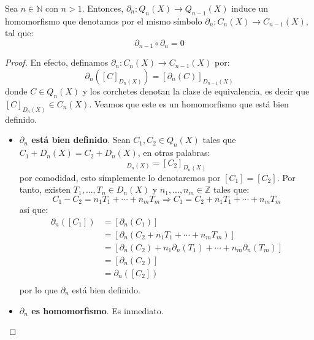 \documentclass[12pt]{report}
\newcounter{it}
\theoremstyle{largebreak}
\newcommand\cf[3]{\ensuremath{#1:#2\rightarrow#3}}
\begin{document}
    \begin{cor}
        Sea $n\in\mathbb{N}$ con $n>1$. Entonces, $\cf{\partial_n}{Q_n(X)}{Q_{ n-1}(X)}$ induce un homomorfismo que denotamos por el mismo símbolo $\cf{\partial_n}{C_n(X)}{C_{n-1}(X)}$, tal que:
        \begin{equation*}
            \partial_{ n-1}\circ\partial_n=0
        \end{equation*}
    \end{cor}

    \begin{proof}
        En efecto, definamos $\cf{\partial_n}{C_n(X)}{C_{n-1}(X)}$ por:
        \begin{equation*}
            \partial_n([C]_{D_n(X)})=[\partial_n(C)]_{D_{n-1}(X)}
        \end{equation*}
        donde $C\in Q_n(X)$ y los corchetes denotan la clase de equivalencia, es decir que $[C]_{D_n(X)}\in C_n(X)$. Veamos que este es un homomorfismo que está bien definido.
        \begin{itemize}
            \item \textbf{$\partial_n$ está bien definido}. Sean $C_1,C_2\in Q_n(X)$ tales que $C_1+D_n(X)=C_2+D_n(X)$, en otras palabras:
            \begin{equation*}
                [C_1]_{D_n(X)}=[C_2]_{D_n(X)}
            \end{equation*}
            por comodidad, esto simplemente lo denotaremos por $[C_1]=[C_2]$. Por tanto, existen $T_1,...,T_n\in D_n(X)$ y $n_1,...,n_m\in\mathbb{Z}$ tales que:
            \begin{equation*}
                C_1-C_2=n_1T_1+\cdots+n_mT_m\Rightarrow C_1=C_2+n_1T_1+\cdots+n_mT_m
            \end{equation*}
            así que:
            \begin{equation*}
                \begin{split}
                    \partial_n([C_1])&=[\partial_n(C_1)]\\
                    &=[\partial_n(C_2+n_1T_1+\cdots+n_mT_m)]\\
                    &=[\partial_n(C_2)+n_1\partial_n(T_1)+\cdots+n_m\partial_n(T_m)]\\
                    &=[\partial_n(C_2)]\\
                    &=\partial_n([C_2])\\
                \end{split}
            \end{equation*}
            por lo que $\partial_n$ está bien definido.
            \item \textbf{$\partial_n$ es homomorfismo}. Es inmediato.
        \end{itemize}
    \end{proof}
\end{document}
